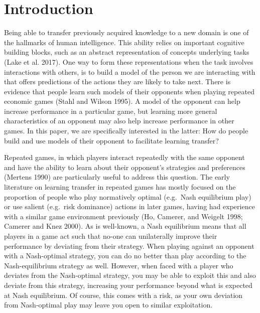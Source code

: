 \documentclass[smallextended]{svjour3}       %
\begin{document}
\def\spacingset#1{\renewcommand{\baselinestretch}%
{#1}\small\normalsize} \spacingset{1}


\hypertarget{introduction}{%
\section{Introduction}\label{introduction}}

Being able to transfer previously acquired knowledge to a new domain is
one of the hallmarks of human intelligence. This ability relies on
important cognitive building blocks, such as an abstract representation
of concepts underlying tasks (Lake et al. 2017). One way to form these
representations when the task involves interactions with others, is to
build a model of the person we are interacting with that offers
predictions of the actions they are likely to take next. There is
evidence that people learn such models of their opponents when playing
repeated economic games (Stahl and Wilson 1995). A model of the opponent
can help increase performance in a particular game, but learning more
general characteristics of an opponent may also help increase
performance in other games. In this paper, we are specifically
interested in the latter: How do people build and use models of their
opponent to facilitate learning transfer?

Repeated games, in which players interact repeatedly with the same
opponent and have the ability to learn about their opponent's strategies
and preferences (Mertens 1990) are particularly useful to address this
question. The early literature on learning transfer in repeated games
has mostly focused on the proportion of people who play normatively
optimal (e.g.~Nash equilibrium play) or use salient (e.g.~risk
dominance) actions in later games, having had experience with a similar
game environment previously (Ho, Camerer, and Weigelt 1998; Camerer and
Knez 2000). As is well-known, a Nash equilibrium means that all players
in a game act such that no-one can unilaterally improve their
performance by deviating from their strategy. When playing against an
opponent with a Nash-optimal strategy, you can do no better than play
according to the Nash-equilibrium strategy as well. However, when faced
with a player who deviates from the Nash-optimal strategy, you may be
able to exploit this and also deviate from this strategy, increasing
your performance beyond what is expected at Nash equilibrium. Of course,
this comes with a risk, as your own deviation from Nash-optimal play may
leave you open to similar exploitation.
\end{document}
